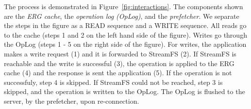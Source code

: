 
The process is demonstrated in Figure~\ref{fig:interactions}.  The components shown are the \emph{ERG cache}, the \emph{operation
log (OpLog)}, and the \emph{prefetcher}.  We separate the steps in the figure as a READ sequence and a WRITE sequence.
All reads go to the cache (steps 1 and 2 on the left hand side of the figure).  Writes go through the OpLog (steps 1 - 5 on the right
side of the figure).  For writes, 
the application makes a write request (1) and it is forwarded to StreamFS (2).  If StreamFS is reachable and the write is
successful (3), the operation is applied to the ERG cache (4) and the response is sent the application (5).
If the operation is not successfuly, step 4 is skipped.  If StreamFS could not be reached, step 3 is skipped, and the operation
is written to the OpLog.  The OpLog is flushed to the server, by the prefetcher, upon re-connection. 




